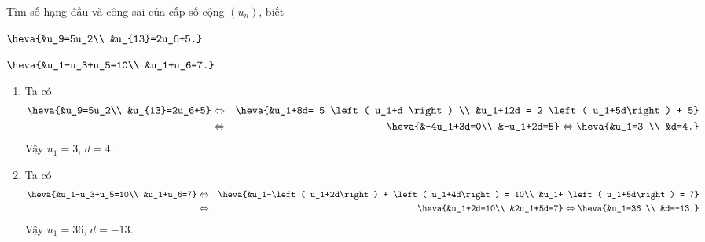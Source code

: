 \begin{bt}%
	Tìm số hạng đầu và công sai của cấp số cộng $(u_n)$, biết
	\begin{listEX}[2]
		\item $\heva{&u_9=5u_2\\ &u_{13}=2u_6+5.}$
		\item $\heva{&u_1-u_3+u_5=10\\ &u_1+u_6=7.}$
	\end{listEX}
	\loigiai
	{
		\begin{enumerate}
			\item Ta có
			\begin{eqnarray*}
				\heva{&u_9=5u_2\\ &u_{13}=2u_6+5} &\Leftrightarrow& \heva{&u_1+8d= 5 \left( u_1+d \right) \\ &u_1+12d = 2 \left( u_1+5d\right) + 5}\\
				&\Leftrightarrow& \heva{&-4u_1+3d=0\\ &-u_1+2d=5} \Leftrightarrow \heva{&u_1=3 \\ &d=4.}
			\end{eqnarray*}
			Vậy $u_1=3$, $d=4$.
			\item Ta có 
			\begin{eqnarray*}
				\heva{&u_1-u_3+u_5=10\\ &u_1+u_6=7} &\Leftrightarrow& \heva{&u_1-\left( u_1+2d\right) + \left( u_1+4d\right) = 10\\ &u_1+ \left( u_1+5d\right) = 7}\\
				&\Leftrightarrow& \heva{&u_1+2d=10\\ &2u_1+5d=7} \Leftrightarrow \heva{&u_1=36 \\ &d=-13.}
			\end{eqnarray*}
			Vậy $u_1=36$, $d=-13$.
		\end{enumerate}
	}
\end{bt}

